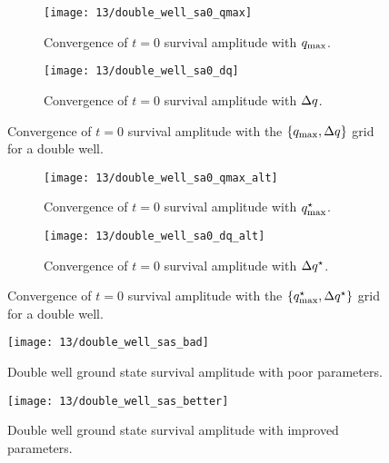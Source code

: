 \begin{figure}
	\setlength{\figspacing}{5 mm}
	\centering
	\begin{subfigure}[b]{\textwidth}
		\texttt{[image: 13/double\_well\_sa0\_qmax]}
		\caption{
			Convergence of $t = 0$ survival amplitude with $q_\mathrm{max}$.
		}
		\vspace{\figspacing}
	\end{subfigure}
	\begin{subfigure}[b]{\textwidth}
		\texttt{[image: 13/double\_well\_sa0\_dq]}
		\caption{
			Convergence of $t = 0$ survival amplitude with $\Delta q$.
		}
	\end{subfigure}
	\caption[
		Double well survival amplitude convergence with position grids
	]{
		Convergence of $t = 0$ survival amplitude with the $\{ q_\mathrm{max}, \Delta q \}$ grid for a double well.
		\explainplotsazero{}
	}
	\label{fig:double-well-survival-zero-q-a}
\end{figure}

\begin{figure}
	\setlength{\figspacing}{5 mm}
	\centering
	\begin{subfigure}[b]{\textwidth}
		\texttt{[image: 13/double\_well\_sa0\_qmax\_alt]}
		\caption{
			Convergence of $t = 0$ survival amplitude with $q_\mathrm{max}^\star$.
		}
		\vspace{\figspacing}
	\end{subfigure}
	\begin{subfigure}[b]{\textwidth}
		\texttt{[image: 13/double\_well\_sa0\_dq\_alt]}
		\caption{
			Convergence of $t = 0$ survival amplitude with $\Delta q^\star$.
		}
	\end{subfigure}
	\caption[
		Double well survival amplitude convergence with position grids \cont
	]{
		Convergence of $t = 0$ survival amplitude with the $\{ q_\mathrm{max}^\star, \Delta q^\star \}$ grid for a double well.
		\explainplotsazero{}
	}
	\label{fig:double-well-survival-zero-q-b}
\end{figure}

\begin{figure}
	\centering
	\texttt{[image: 13/double\_well\_sas\_bad]}
	\caption[
		Double well survival amplitude with poor parameters
	]{
		Double well ground state survival amplitude with poor parameters.
		\explainplotsas{}
	}
	\label{fig:double-well-survival-bad}
\end{figure}

\begin{figure}
	\centering
	\texttt{[image: 13/double\_well\_sas\_better]}
	\caption[
		Double well survival amplitude with improved parameters
	]{
		Double well ground state survival amplitude with improved parameters.
		\explainplotsas{}
	}
	\label{fig:double-well-survival-better}
\end{figure}

